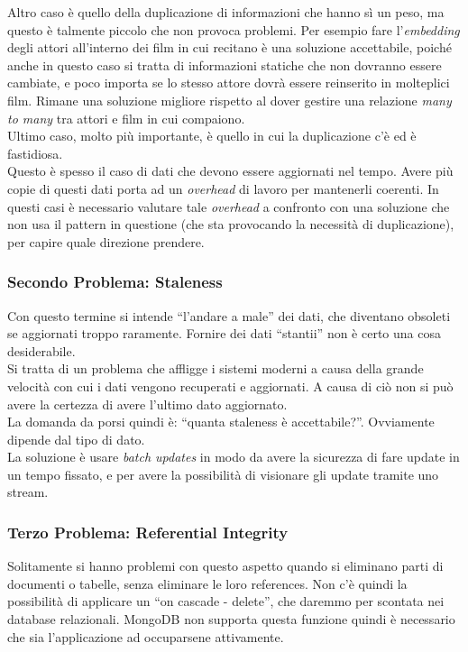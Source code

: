 \noindent Altro caso è quello della duplicazione di informazioni che hanno sì un peso, ma questo è talmente piccolo che non provoca problemi. Per esempio fare l'\textit{embedding} degli attori all'interno dei film in cui recitano è una soluzione accettabile, poiché anche in questo caso si tratta di informazioni statiche che non dovranno essere cambiate, e poco importa se lo stesso attore dovrà essere reinserito in molteplici film. Rimane una soluzione migliore rispetto al dover gestire una relazione \textit{many to many} tra attori e film in cui compaiono.\\

\noindent Ultimo caso, molto più importante, è quello in cui la duplicazione c'è ed è fastidiosa.\\
Questo è spesso il caso di dati che devono essere aggiornati nel tempo. Avere più copie di questi dati porta ad un \textit{overhead} di lavoro per mantenerli coerenti. In questi casi è necessario valutare tale \textit{overhead} a confronto con una soluzione che non usa il pattern in questione (che sta provocando la necessità di duplicazione), per capire quale direzione prendere.\\

\subsubsection{Secondo Problema: Staleness}
Con questo termine si intende ``l'andare a male'' dei dati, che diventano obsoleti se aggiornati troppo raramente. Fornire dei dati ``stantii'' non è certo una cosa desiderabile.\\
Si tratta di un problema che affligge i sistemi moderni a causa della grande velocità con cui i dati vengono recuperati e aggiornati. A causa di ciò non si può avere la certezza di avere l'ultimo dato aggiornato.\\
La domanda da porsi quindi è: ``quanta staleness è accettabile?''. Ovviamente dipende dal tipo di dato.\\
La soluzione è usare \textit{batch updates} in modo da avere la sicurezza di fare update in un tempo fissato, e per avere la possibilità di visionare gli update tramite uno stream.\\

\subsubsection{Terzo Problema: Referential Integrity}
Solitamente si hanno problemi con questo aspetto quando si eliminano parti di documenti o tabelle, senza eliminare le loro references. Non c'è quindi la possibilità di applicare un ``on cascade - delete'', che daremmo per scontata nei database relazionali. MongoDB non supporta questa funzione quindi è necessario che sia l'applicazione ad occuparsene attivamente.\\\\

